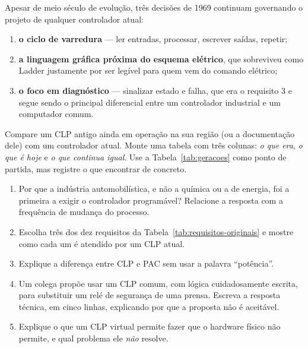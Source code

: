 Apesar de meio século de evolução, três decisões de 1969 continuam governando o projeto de
qualquer controlador atual:

\begin{enumerate}
  \item \textbf{o ciclo de varredura} --- ler entradas, processar, escrever saídas, repetir;
  \item \textbf{a linguagem gráfica próxima do esquema elétrico}, que sobreviveu como Ladder
        justamente por ser legível para quem vem do comando elétrico;
  \item \textbf{o foco em diagnóstico} --- sinalizar estado e falha, que era o requisito 3 e segue
        sendo o principal diferencial entre um controlador industrial e um computador comum.
\end{enumerate}

\begin{pratica}
Compare um CLP antigo ainda em operação na sua região (ou a documentação dele) com um controlador
atual. Monte uma tabela com três colunas: \emph{o que era}, \emph{o que é hoje} e \emph{o que
continua igual}. Use a Tabela~\ref{tab:geracoes} como ponto de partida, mas registre o que
encontrar de concreto.
\end{pratica}

\begin{exercicios}
\begin{enumerate}[label=\alph*)]
  \item Por que a indústria automobilística, e não a química ou a de energia, foi a primeira a
        exigir o controlador programável? Relacione a resposta com a frequência de mudança do
        processo.
  \item Escolha três dos dez requisitos da Tabela~\ref{tab:requisitos-originais} e mostre como cada
        um é atendido por um CLP atual.
  \item Explique a diferença entre CLP e PAC sem usar a palavra ``potência''.
  \item Um colega propõe usar um CLP comum, com lógica cuidadosamente escrita, para substituir um
        relé de segurança de uma prensa. Escreva a resposta técnica, em cinco linhas, explicando
        por que a proposta não é aceitável.
  \item Explique o que um CLP virtual permite fazer que o hardware físico não permite, e qual
        problema ele \emph{não} resolve.
\end{enumerate}
\end{exercicios}
